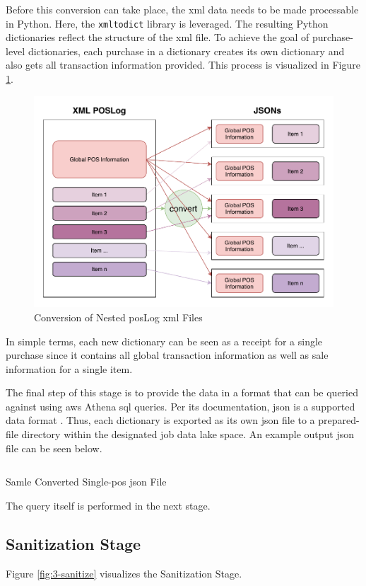 Before this conversion can take place, the \ac{xml} data needs to be made processable in Python. Here, the \texttt{xmltodict} library is leveraged. The resulting Python dictionaries reflect the structure of the \ac{xml} file. To achieve the goal of purchase-level dictionaries, each purchase in a dictionary creates its own dictionary and also gets all transaction information provided. This process is visualized in Figure \ref{fig:3-convert-process}. %

\begin{figure}[h!]
	\centering
	\includegraphics[width=0.67\linewidth]{main-matter/img/3-convert-process.pdf}
	\caption{Conversion of Nested \acs{pos}Log \acs{xml} Files}
	\label{fig:3-convert-process}
\end{figure}

In simple terms, each new dictionary can be seen as a receipt for a single purchase since it contains all global transaction information as well as sale information for a single item.

The final step of this stage is to provide the data in a format that can be queried against using \ac{aws} Athena \ac{sql} queries. Per its documentation, \ac{json} is a supported data format \cite{athena}. Thus, each dictionary is exported as its own \ac{json} file to a prepared-file directory within the designated job data lake space. An example output \ac{json} file can be seen below.

\begin{longlisting}
	\inputminted{json}{main-matter/src/3-json.json}
	\caption{Samle Converted Single-\acs{pos} \acs{json} File}
	\label{src:3-json}
\end{longlisting}

The query itself is performed in the next stage.

\subsection{Sanitization Stage}
Figure \ref{fig:3-sanitize} visualizes the Sanitization Stage.

